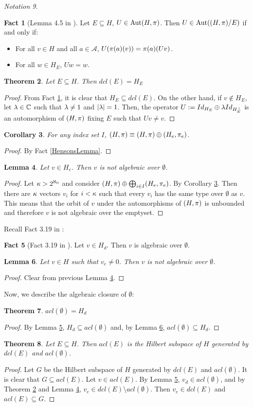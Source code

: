 \documentclass{amsart}
\def\bitm{\begin{itemize}}\def\eitm{\end{itemize}}
\def\bth{\begin{theo}}\def\eth{\end{theo}}
\def\bfc{\begin{fact}}\def\efc{\end{fact}}
\def\bco{\begin{coro}}\def\eco{\end{coro}}
\def\blm{\begin{lemma}}\def\elm{\end{lemma}}
\def\bpf{\begin{proof}}\def\epf{\end{proof}}
\def\A{\mathcal{A}}
\newtheorem{theo}{Theorem}[section]
\newtheorem{coro}[theo]{Corollary}
\newtheorem{lemma}[theo]{Lemma}
\theoremstyle{definition}
\newtheorem{fact}[theo]{Fact}
\theoremstyle{remark}
\newtheorem{nota}[theo]{Notation}
\newcommand{\C}{\ensuremath{\mathbb{C}}}
\newcommand{\Aut}{\ensuremath{\text{Aut}}}
\begin{document}
\begin{nota}
\begin{fact}[Lemma 4.5 in \cite{Ar}]\label{Aut(H/E)}
Let $E\subseteq H$, $U\in \Aut(H,\p)$. Then $U\in \Aut((H,\p)/E)$ if and only if:
\bitm
\item For all $v\in H$ and all $a\in\A$, $U(\pi(a)(v))=\pi(a)(Uv)$.
\item For all $w\in H_E$, $Uw=w$.
\eitm
\end{fact}
	
\begin{theo}\label{definclosure}
Let $E\subseteq H$. Then $dcl(E)=H_E$
\end{theo}
\begin{proof}
From Fact \ref{Aut(H/E)}, it is clear that $H_E\subseteq dcl(E)$. On the other hand, if $v\not\in H_E$, let $\l\in \C$ such that $\lambda\neq 1$ and $|\lambda|=1$. Then, the operator $U:=Id_{H_E}\oplus \lambda Id_{H_E^\perp}$ is an automorphism of $(H,\pi)$ fixing $E$ such that $Uv\neq v$.
\end{proof}

\bco \label{CoroElementaryEquivalent}
For any index set $I$, $(H,\pi)\equiv (H,\pi)\oplus(H_e,\pi_e)$.
\eco
\bpf
By Fact \ref{HensonsLemma}.
\epf

\blm\label{Henotalgebraicoveremptyset}
Let $v\in H_e$. Then $v$ is not algebraic over $\emptyset$. 
\elm
\bpf
Let $\kappa>2^{\aleph_0}$ and consider $(H,\pi)\oplus\bigoplus_{i\in I}(H_e,\pi_e)$. By Corollary \ref{CoroElementaryEquivalent}. Then there are $\kappa$ vectors $v_i$ for $i<\kappa$ such that every $v_i$ has the same type over $\emptyset$ as $v$. This means that the orbit of $v$ under the automorphisms of $(H,\pi)$ is unbounded and therefore $v$ is not algebraic over the emptyset.
\epf


Recall Fact 3.19 in \cite{Ar}:
\bfc[Fact 3.19 in \cite{Ar}]\label{Hdsubsetalgebraicclosureofemptyset}
Let $v\in H_d$. Then $v$ is algebraic over $\emptyset$.
\efc

\blm\label{LemmaIfVeNotZeroVNotAlgebraic}
Let $v\in H$ such that $v_e\neq 0$. Then $v$ is not algebraic over $\emptyset$.
\elm
\bpf
Clear from previous Lemma \ref{Henotalgebraicoveremptyset}.
\epf

Now, we describe the algebraic closure of $\emptyset$:
\bth\label{aclemptyset}
$acl(\emptyset)=H_d$
\eth
\bpf
By Lemma \ref{Hdsubsetalgebraicclosureofemptyset}, $H_d\subseteq acl(\emptyset)$ and, by Lemma \ref{LemmaIfVeNotZeroVNotAlgebraic}, $acl(\emptyset)\subseteq H_d$.
\epf

\bth\label{aclE}
Let $E\subseteq H$. Then $acl(E)$ is the Hilbert subspace of $H$ generated by $dcl(E)$ and $acl(\emptyset)$.
\eth
\bpf
Let $G$ be the Hilbert subspace of $H$ generated by $dcl(E)$ and $acl(\emptyset)$. It is clear that $G\subseteq acl(E)$. Let $v\in acl(E)$. By Lemma \ref{Hdsubsetalgebraicclosureofemptyset}, $v_d\in acl(\emptyset)$, and by Theorem \ref{definclosure} and Lemma \ref{Henotalgebraicoveremptyset}, $v_e\in dcl(E)\setminus acl(\emptyset)$. Then $v_e\in dcl(E)$ and $acl(E)\subseteq G$.
\epf



\end{nota}
\end{document}
